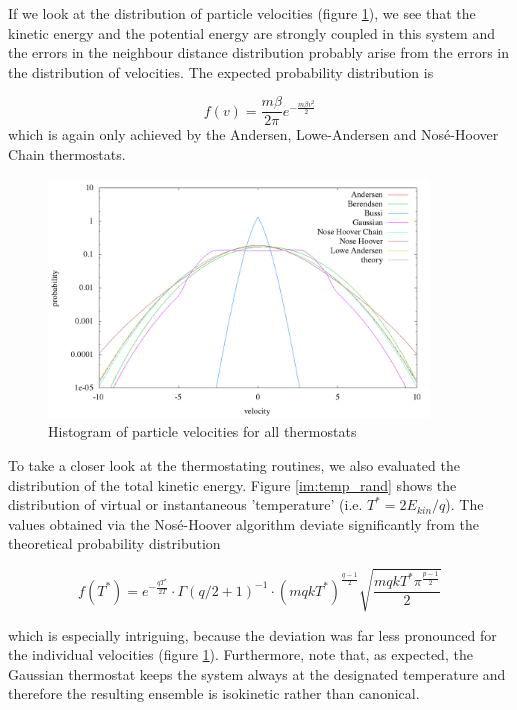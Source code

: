 If we look at the distribution of particle velocities (figure \ref{im:vel_rand}), we see that the kinetic energy and the potential energy are strongly coupled in this system and the errors in the neighbour distance distribution probably arise from the errors in the distribution of velocities. The expected probability distribution is

\begin{equation}
f(v) = \frac{m\beta}{2\pi}e^{-\frac{m\beta v^2}{2}}
\end{equation} 
which is again only achieved by the Andersen, Lowe-Andersen and Nosé-Hoover Chain thermostats. 

\begin{figure}[H]
\centering
\includegraphics[width=0.9\textwidth]{./graphics/Histogramm_velocity_rand_T=20_p=64.png}
\caption{Histogram of particle velocities for all thermostats}
\label{im:vel_rand}
\end{figure}

To take a closer look at the thermostating routines, we also evaluated the distribution of the total kinetic energy. Figure \ref{im:temp_rand} shows the distribution of virtual or instantaneous 'temperature' (i.e. $T^* = 2E_{kin}/q$). The values obtained via the Nosé-Hoover algorithm deviate significantly from the theoretical probability distribution

\begin{equation}
f(T^*) = e^{-\frac{qT^{*}}{2T}}\cdot \Gamma(q/2+1)^{-1}\cdot (mqkT^{*})^{\frac{q-1}{2}} \sqrt{\frac{mqkT^{*}\pi^{\frac{p-1}{2}}}{2}} 
\end{equation}

which is especially intriguing, because the deviation was far less pronounced for the individual velocities (figure \ref{im:vel_rand}). Furthermore, note that, as expected, the Gaussian thermostat keeps the system always at the designated temperature and therefore the resulting ensemble is isokinetic rather than canonical.  


